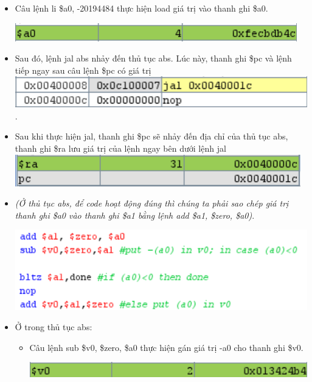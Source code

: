 \documentclass[12pt,a4paper,oneside]{article}
\begin{document}
\begin{itemize}
	\item Câu lệnh \colorbox{code}{li \$a0, -20194484} thực hiện load giá trị vào thanh ghi \$a0.
	\begin{center}
	\includegraphics[scale=1]{image/1.2}
	\end{center}
	\item Sau đó, lệnh \colorbox{code}{jal abs} nhảy đến thủ tục abs. Lúc này, thanh ghi \$pc và lệnh tiếp ngay sau câu lệnh \$pc có giá trị \includegraphics[scale=1]{image/1.3.1}. 
	\item Sau khi thực hiện \colorbox{code}{jal}, thanh ghi \$pc sẽ nhảy đến địa chỉ của thủ tục abs, thanh ghi \$ra lưu giá trị của lệnh ngay bên dưới lệnh \colorbox{code}{jal} \includegraphics[scale=1]{image/1.4}
	\item \textit{(Ở thủ tục abs, để code hoạt động đúng thì chúng ta phải sao chép giá trị thanh ghi \$a0 vào thanh ghi \$a1 bằng lệnh \colorbox{code}{add \$a1, \$zero, \$a0})}.
	\begin{center}
	\includegraphics[scale=1]{image/1.3}
	\end{center}
	\item Ở trong thủ tục abs:
		\begin{itemize}
		\item Câu lệnh \colorbox{code}{sub \$v0, \$zero, \$a0} thực hiện gán giá trị -a0 cho thanh ghi \$v0.
		\begin{center}
		\includegraphics[scale=1]{image/1.5}

\end{center}
\end{itemize}
\end{itemize}
\end{document}
